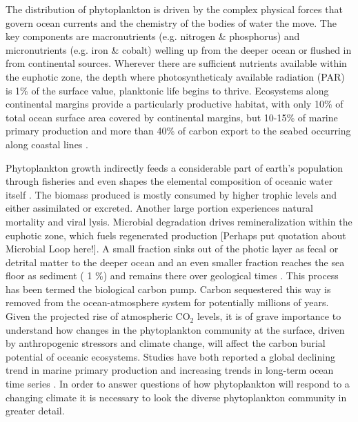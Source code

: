 The distribution of phytoplankton is driven by the complex physical forces that govern ocean currents and the chemistry of the bodies of water the move. The key components are macronutrients (e.g. nitrogen \& phosphorus) and micronutrients (e.g. iron \& cobalt) welling up from the deeper ocean or flushed in from continental sources. Wherever there are sufficient nutrients available within the euphotic zone, the depth where photosyntheticaly available radiation (PAR) is 1\% of the surface value, planktonic life begins to thrive. Ecosystems along continental margins provide a particularly productive habitat, with only 10\% of total ocean surface area covered by continental margins, but 10-15\% of marine primary production and more than 40\% of carbon export to the seabed occurring along coastal lines \citep{Yool2001,Muller-Karger2005}.


Phytoplankton growth indirectly feeds a considerable part of earth’s population through fisheries \citep{Stock2017} and even shapes the elemental composition of oceanic water itself \citep{Redfield1958}. 
The biomass produced is mostly consumed by higher trophic levels and either assimilated or excreted. Another large portion experiences natural mortality and viral lysis. Microbial degradation drives remineralization within the euphotic zone, which fuels regenerated production \citep{Eppley1979} [Perhaps put quotation about Microbial Loop here!]. 
A small fraction sinks out of the photic layer as fecal or detrital matter to the deeper ocean and an even smaller fraction reaches the sea floor as sediment ( 1 \%) and remains there over geological times \citep{Honjo2008}. This process has been termed the biological carbon pump. Carbon sequestered this way is removed from the ocean-atmosphere system for potentially millions of years. Given the projected rise of atmospheric CO$_2$ levels, it is of grave importance to understand how changes in the phytoplankton community at the surface, driven by anthropogenic stressors and climate change, will affect the carbon burial potential of oceanic ecosystems. 
Studies have both reported a global declining trend in marine primary production \citep{Boyce2012} and increasing trends in long-term ocean time series \citep{Chavez2011a}. 
In order to answer questions of how phytoplankton will respond to a changing climate it is necessary to look the diverse phytoplankton community in greater detail. 

